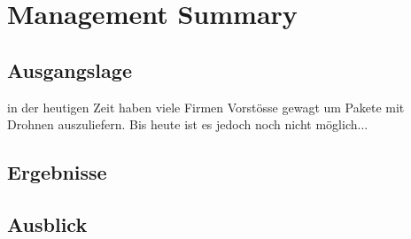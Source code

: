 \newpage
{}
\chapter*{Management Summary}
\section*{Ausgangslage}
in der heutigen Zeit haben viele Firmen Vorstösse gewagt um Pakete mit Drohnen auszuliefern. Bis heute ist es jedoch noch nicht möglich...
\section*{Ergebnisse}

\section*{Ausblick}
